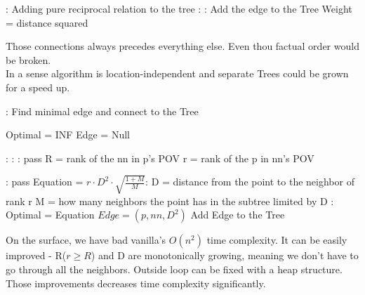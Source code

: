 \documentclass[12pt, a4paper, twocolumn]{article}
\begin{document}
\begin{appendices}
\begin{algorithm}
  \begin{algorithmic}[1]
    : \Comment Adding pure reciprocal relation to the tree
      :
        :
            \State Add the edge to the Tree 
            \State Weight = distance squared
        \EndIf
      \EndFor
    \EndProcedure
  \end{algorithmic}
  \end{algorithm}

Those connections always precedes everything else. Even thou factual order would be broken. 
\\ In a sense algorithm is location-independent and separate Trees could be grown for a speed up. 

  \begin{algorithm}[h]
    \begin{algorithmic}[2]
      : \Comment Find minimal edge and connect to the Tree
        \Repeat
          
          \State Optimal = INF
          \State Edge = Null  
        
          :
            :
              :
                \State pass
              \EndIf
              \State R = rank of the nn in p's POV
              \State r = rank of the p in nn's POV
                
              :
                \State pass
              \EndIf
              \State Equation = $r \cdot D^2 \cdot \sqrt{\frac{1+M}{M}}$:
                \State \indent D = distance from the point to the neighbor of rank r
                \State \indent M = how many neighbors the point has in the subtree limited by D
              :
                \State Optimal = Equation
                \State $Edge = (p, nn, D^2)$
              \EndIf
            \EndFor
          \EndFor
          \State Add Edge to the Tree
        \State
      \EndProcedure
\end{algorithmic}
\end{algorithm}

On the surface, we have bad vanilla's $O(n^2)$ time complexity. It can be easily improved - R($r\geq R$) and D are monotonically growing, meaning we don't have to go through all the neighbors.
Outside loop can be fixed with a heap\cite{ArticleReference12} structure.
\\ Those improvements decreases time complexity significantly.


\end{appendices}
\end{document}
